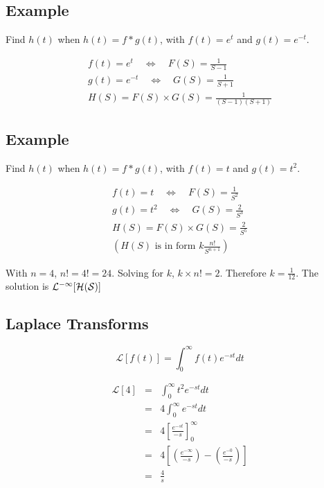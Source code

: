\documentclass[12pt, a4paper]{article}
\begin{document}
\subsection{Example}
Find $h(t)$ when $h(t) = f*g(t)$, with $f(t)= e^{t}$ and $g(t)=
e^{-t}$.\newline

\begin{eqnarray}
f(t) = e^{t} \quad \Leftrightarrow \quad F(S)= \frac{1}{S-1}
 \nonumber\\
g(t) = e^{-t} \quad \Leftrightarrow \quad G(S)= \frac{1}{S+1}
 \nonumber\\
H(S) = F(S)\times G(S) = \frac{1}{(S-1)(S+1)}
 \nonumber
\end{eqnarray}
\subsection{Example}
Find $h(t)$ when $h(t) = f*g(t)$, with $f(t)= t$ and $g(t)=
t^2$.\newline

\begin{eqnarray}
f(t) = t \quad \Leftrightarrow \quad F(S)= \frac{1}{S^2}
 \nonumber\\
g(t) = t^2 \quad \Leftrightarrow \quad G(S)= \frac{2}{S^3}
 \nonumber\\
H(S) = F(S)\times G(S) = \frac{2}{S^5}
 \nonumber\\
(H(S) \mbox{ is in form }  k\frac{n!}{S^{n+1}} )
 \nonumber
\end{eqnarray}

With $n=4$, $n!= 4! = 24$. Solving for $k$, $k \times n! = 2$.
Therefore $k=\frac{1}{12}$. The solution is $\cal{L}^{-1}[H(S)]$

\newpage
\subsection*{Laplace Transforms}

\[ \mathcal{L}[f(t)] =  \int^{\infty}_0 f(t) e^{-st}dt \]

\begin{eqnarray}
\mathcal{L}[4] &=&  \int^{\infty}_0 t^2 e^{-st}dt \\
&=&  4 \int^{\infty}_0 e^{-st}dt \\
&=&  4 \left[ \frac{e^{-st}}{-s} \right]^{\infty}_0 \\
&=&  4 \left[ \left(\frac{e^{-\infty}}{-s} \right) -  \left(\frac{e^{-0}}{-s} \right)\right]\\
&=&  \frac{4}{s}
\end{eqnarray}
\end{document}
